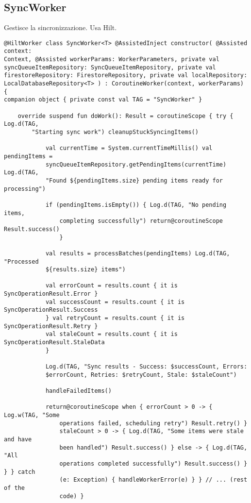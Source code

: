 \subsection{SyncWorker}\label{subsec:syncworker} Gestisce la sincronizzazione.
Usa Hilt.

\begin{lstlisting}[caption=SyncWorker.kt, label=lst:syncworker, basicstyle=\ttfamily\scriptsize, breaklines=true, breakatwhitespace=true, tabsize=4]
@HiltWorker class SyncWorker<T> @AssistedInject constructor( @Assisted context:
Context, @Assisted workerParams: WorkerParameters, private val
syncQueueItemRepository: SyncQueueItemRepository, private val
firestoreRepository: FirestoreRepository, private val localRepository:
LocalDatabaseRepository<T> ) : CoroutineWorker(context, workerParams) {
companion object { private const val TAG = "SyncWorker" }

    override suspend fun doWork(): Result = coroutineScope { try { Log.d(TAG,
        "Starting sync work") cleanupStuckSyncingItems()

            val currentTime = System.currentTimeMillis() val pendingItems =
            syncQueueItemRepository.getPendingItems(currentTime) Log.d(TAG,
            "Found ${pendingItems.size} pending items ready for processing")

            if (pendingItems.isEmpty()) { Log.d(TAG, "No pending items,
                completing successfully") return@coroutineScope Result.success()
                }

            val results = processBatches(pendingItems) Log.d(TAG, "Processed
            ${results.size} items")

            val errorCount = results.count { it is SyncOperationResult.Error }
            val successCount = results.count { it is SyncOperationResult.Success
            } val retryCount = results.count { it is SyncOperationResult.Retry }
            val staleCount = results.count { it is SyncOperationResult.StaleData
            }

            Log.d(TAG, "Sync results - Success: $successCount, Errors:
            $errorCount, Retries: $retryCount, Stale: $staleCount")

            handleFailedItems()

            return@coroutineScope when { errorCount > 0 -> { Log.w(TAG, "Some
                operations failed, scheduling retry") Result.retry() }
                staleCount > 0 -> { Log.d(TAG, "Some items were stale and have
                been handled") Result.success() } else -> { Log.d(TAG, "All
                operations completed successfully") Result.success() } } } catch
                (e: Exception) { handleWorkerError(e) } } // ... (rest of the
                code) }
\end{lstlisting}

